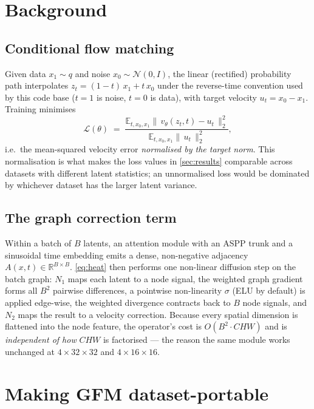 \documentclass[11pt]{article}
\newcommand{\GFM}{\textsc{GFM}}
\begin{document}
\section{Background}
\label{sec:background}

\subsection{Conditional flow matching}
Given data $x_1 \sim q$ and noise $x_0 \sim \mathcal{N}(0, I)$, the linear
(rectified) probability path interpolates
$z_t = (1-t)\,x_1 + t\,x_0$ under the reverse-time convention used by this code
base ($t=1$ is noise, $t=0$ is data), with target velocity
$u_t = x_0 - x_1$. Training minimises
\begin{equation}
  \label{eq:cfm}
  \mathcal{L}(\theta) \;=\;
  \frac{\mathbb{E}_{t,x_0,x_1}\big\|\, v_\theta(z_t,t) - u_t \,\big\|_2^2}
       {\mathbb{E}_{t,x_0,x_1}\big\|\, u_t \,\big\|_2^2},
\end{equation}
i.e.\ the mean-squared velocity error \emph{normalised by the target norm}. This
normalisation is what makes the loss values in \cref{sec:results} comparable
across datasets with different latent statistics; an unnormalised loss would be
dominated by whichever dataset has the larger latent variance.

\subsection{The graph correction term}
Within a batch of $B$ latents, an attention module with an ASPP trunk and a
sinusoidal time embedding emits a dense, non-negative adjacency
$A(x,t)\in\mathbb{R}^{B\times B}$. \cref{eq:heat} then performs one non-linear
diffusion step on the batch graph: $N_1$ maps each latent to a node signal, the
weighted graph gradient forms all $B^2$ pairwise differences, a pointwise
non-linearity $\sigma$ (ELU by default) is applied edge-wise, the weighted
divergence contracts back to $B$ node signals, and $N_2$ maps the result to a
velocity correction. Because every spatial dimension is flattened into the node
feature, the operator's cost is $O(B^2 \cdot C H W)$ and is \emph{independent of
how} $CHW$ is factorised --- the reason the same module works unchanged at
$4\times32\times32$ and $4\times16\times16$.

\section{Making \GFM{} dataset-portable}
\label{sec:port}
\end{document}

